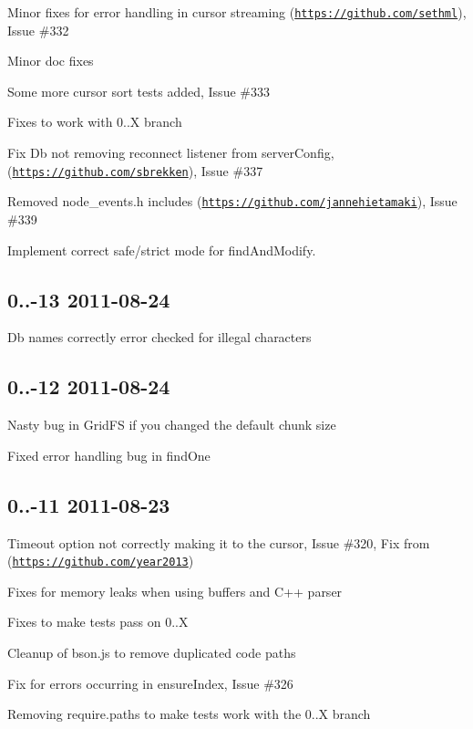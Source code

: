 \begin{DoxyItemize}
\item Minor fixes for error handling in cursor streaming (\href{https://github.com/sethml}{\tt https\+://github.\+com/sethml}), Issue \#332
\item Minor doc fixes
\item Some more cursor sort tests added, Issue \#333
\item Fixes to work with 0..\+X branch
\item Fix Db not removing reconnect listener from server\+Config, (\href{https://github.com/sbrekken}{\tt https\+://github.\+com/sbrekken}), Issue \#337
\item Removed node\+\_\+events.\+h includes (\href{https://github.com/jannehietamaki}{\tt https\+://github.\+com/jannehietamaki}), Issue \#339
\item Implement correct safe/strict mode for find\+And\+Modify.
\end{DoxyItemize}

\subsection*{0..-\/13 2011-\/08-\/24 }


\begin{DoxyItemize}
\item Db names correctly error checked for illegal characters
\end{DoxyItemize}

\subsection*{0..-\/12 2011-\/08-\/24 }


\begin{DoxyItemize}
\item Nasty bug in Grid\+FS if you changed the default chunk size
\item Fixed error handling bug in find\+One
\end{DoxyItemize}

\subsection*{0..-\/11 2011-\/08-\/23 }


\begin{DoxyItemize}
\item Timeout option not correctly making it to the cursor, Issue \#320, Fix from (\href{https://github.com/year2013}{\tt https\+://github.\+com/year2013})
\item Fixes for memory leaks when using buffers and C++ parser
\item Fixes to make tests pass on 0..\+X
\item Cleanup of bson.\+js to remove duplicated code paths
\item Fix for errors occurring in ensure\+Index, Issue \#326
\item Removing require.\+paths to make tests work with the 0..\+X branch
\end{DoxyItemize}


